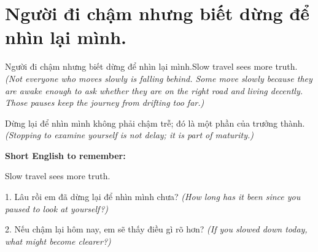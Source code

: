 \section{Người đi chậm nhưng biết dừng để nhìn lại mình.}
\begin{truyen}{Người đi chậm nhưng biết dừng để nhìn lại mình.}{Slow travel sees more truth.}
\textit{(Not everyone who moves slowly is falling behind. Some move slowly because they are awake enough to ask whether they are on the right road and living decently. Those pauses keep the journey from drifting too far.)}
\end{truyen}
\begin{baihoc}
Dừng lại để nhìn mình không phải chậm trễ; đó là một phần của trưởng thành.
\textit{(Stopping to examine yourself is not delay; it is part of maturity.)}
\end{baihoc}
\begin{ghinhoanh}
\textbf{Short English to remember:}

Slow travel sees more truth.
\end{ghinhoanh}
\begin{tuhocnhanh}
1. Lâu rồi em đã dừng lại để nhìn mình chưa? \textit{(How long has it been since you paused to look at yourself?)}

2. Nếu chậm lại hôm nay, em sẽ thấy điều gì rõ hơn? \textit{(If you slowed down today, what might become clearer?)}
\end{tuhocnhanh}
\ngancach